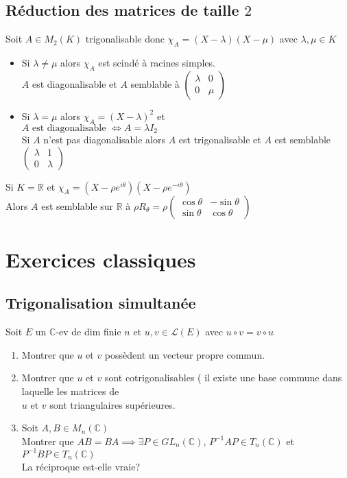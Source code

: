 \documentclass[10pt,a4paper]{article}
\theoremstyle{definition}
\begin{document}
\subsection{Réduction des matrices de taille $2$}
\noindent Soit $A \in M_2(K)$ trigonalisable donc $\chi_A = (X - \lambda)(X - \mu)$ avec $\lambda, \mu \in K$
\begin{itemize}
\item Si $\lambda \neq \mu$ alors $\chi_A$ est scindé à racines simples. \\
$A$ est diagonalisable et $A$ semblable à $\begin{pmatrix}
\lambda & 0 \\
0 & \mu
\end{pmatrix}$
\item Si $\lambda = \mu$ alors $\chi_A = (X - \lambda)^2$ et \\
$A \text{ est diagonalisable } \iff A = \lambda I_2 $ \\
Si $A$ n'est pas diagonalisable alors $A$ est trigonalisable et $A$ est semblable $\begin{pmatrix}
\lambda & 1 \\
0 & \lambda
\end{pmatrix}$
\end{itemize}
Si $K = \mathbb{R}$ et $\chi_A = (X - \rho e^{i \theta})(X - \rho e^{-i \theta})$ \\
Alors $A$ est semblable sur $\mathbb{R}$ à $\rho R_\theta = \rho \begin{pmatrix}
\cos \theta & - \sin \theta \\
\sin \theta & \cos \theta
\end{pmatrix}$

\section{Exercices classiques}
\renewcommand{\labelenumi}{\arabic{enumi}.}
\subsection{Trigonalisation simultanée}
\noindent Soit $E$ un $\mathbb{C}$-ev de dim finie $n$ et $u, v \in \mathcal{L}(E)$ avec $u \circ v = v \circ u$
\begin{enumerate}
\item Montrer que $u$ et $v$ possèdent un vecteur propre commun.
\item Montrer que $u$ et $v$ sont cotrigonalisables ( il existe une base commune dans laquelle les matrices de \\
$u$ et $v$ sont triangulaires supérieures.
\item Soit $A, B \in M_n(\mathbb{C})$ \\
Montrer que $AB = BA \implies \exists P \in GL_n(\mathbb{C})$, $P^{-1}AP \in T_n(\mathbb{C})$ et $P^{-1}BP \in T_n(\mathbb{C})$ \\
La réciproque est-elle vraie?
\end{enumerate}
\end{document}
